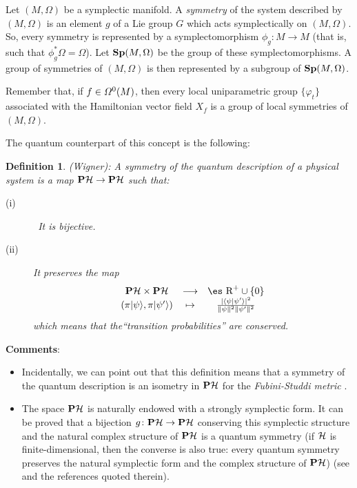 \documentclass[12pt]{article}
\newtheorem{definition}{Definition}
\def\H{{\cal H}}
\def\sta{|\psi \rangle }
\def\Real{\mbox{\es R}}
\begin{document}
Let $(M,\Omega )$ be a symplectic manifold.
A {\it symmetry} of the system described by $(M,\Omega )$
is an element $g$ of a Lie group $G$ which acts symplectically on
$(M,\Omega )$.
So, every symmetry is represented by a symplectomorphism
$\phi_g \colon M \to M$ (that is, such that $\phi_g^*\Omega =\Omega$).
Let ${\bf Sp}(M,\Omega )$ be the group of these symplectomorphisms.
A group of symmetries of $(M,\Omega )$ is then represented
by a subgroup of ${\bf Sp}(M,\Omega )$.

Remember that, if $f \in {\mit\Omega}^0(M)$,
then every local uniparametric group $\{ \varphi_t \}$
associated with the Hamiltonian vector field $X_f$
is a group of local symmetries of $(M,\Omega )$.

The quantum counterpart of this concept is the following:

\begin{definition}
{\rm (Wigner):}
A {\rm symmetry} of the quantum description of a physical system is a
map
${\bf P}\H \to {\bf P}\H$ such that:
\begin{description}
\item[{\rm (i)}] \
It is  bijective.
\item[{\rm (ii)}]
It preserves the map
$$
\begin{array}{ccc}
{\bf P}\H \times {\bf P}\H & \longrightarrow & \Real^+ \cup \{ 0 \}
\\
(\pi \sta , \pi |\psi '\rangle ) & \mapsto &
\frac{\mid \langle \psi | \psi '\rangle \mid^2}
{\| \psi \|^2 \| \psi '\|^2}
\end{array}
$$
which means that the``transition probabilities'' are conserved.
\end{description}
\label{qsym}
\end{definition}
%
\goodbreak
{\bf Comments}:
\begin{itemize}
\item
Incidentally, we can point out that
this definition means that a symmetry of the quantum description
is an isometry in ${\bf P}\H$ for the {\it Fubini-Studdi metric}
\cite{Wl-85}.
\item
The space ${\bf P}\H$ is naturally endowed with a strongly symplectic
form.
It can be proved that a bijection $g \colon {\bf P}\H \to {\bf P}\H$
conserving this symplectic structure and the natural complex
structure of ${\bf P}\H$ is a quantum symmetry
(if $\H$ is finite-dimensional, then the converse is also true:
every quantum symmetry preserves the natural symplectic form
and the complex structure of ${\bf P}\H$)
(see \cite{Tu-87} and the references quoted therein).
\end{itemize}
\end{document}
